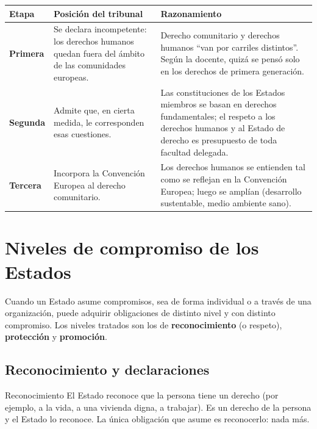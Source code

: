 \documentclass[12pt,oneside]{book}
\begin{document}
\begin{table}[H]
\centering
\small
\begin{tabularx}{\textwidth}{
    >{\raggedright\arraybackslash}p{}
    >{\raggedright\arraybackslash}X
    >{\raggedright\arraybackslash}X
}
\toprule
\textbf{Etapa} &
\textbf{Posición del tribunal} &
\textbf{Razonamiento} \\
\midrule

\textbf{Primera} &
Se declara incompetente: los derechos humanos quedan fuera del ámbito de las comunidades europeas. &
Derecho comunitario y derechos humanos ``van por carriles distintos''. Según la docente, quizá se pensó solo en los derechos de primera generación. \\

\textbf{Segunda} &
Admite que, en cierta medida, le corresponden esas cuestiones. &
Las constituciones de los Estados miembros se basan en derechos fundamentales; el respeto a los derechos humanos y al Estado de derecho es presupuesto de toda facultad delegada. \\

\textbf{Tercera} &
Incorpora la Convención Europea al derecho comunitario. &
Los derechos humanos se entienden tal como se reflejan en la Convención Europea; luego se amplían (desarrollo sustentable, medio ambiente sano). \\

\bottomrule
\end{tabularx}
\end{table}

\chapter[Niveles de compromiso de los Estados]{Niveles de compromiso de los Estados}

Cuando un Estado asume compromisos, sea de forma individual o a través de una organización, puede adquirir obligaciones de distinto nivel y con distinto compromiso. Los niveles tratados son los de \textbf{reconocimiento} (o respeto), \textbf{protección} y \textbf{promoción}.

\section{Reconocimiento y declaraciones}

\begin{definition}{Reconocimiento}
El Estado reconoce que la persona tiene un derecho (por ejemplo, a la vida, a una vivienda digna, a trabajar). Es un derecho de la persona y el Estado lo reconoce. La única obligación que asume es reconocerlo: nada más.
\end{definition}
\end{document}
